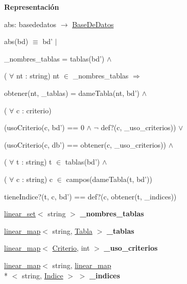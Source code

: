 \begin{Indent}{\bf Representación}
{abs\-: basededatos $\to$ \hyperlink{classBaseDeDatos}{Base\-De\-Datos}\par
abs(bd) $\equiv$ bd' $|$
\begin{DoxyItemize}
\item \-\_\-nombres\-\_\-tablas = tablas(bd') $\land$
\item ( $\forall$ nt \-: string) nt $\in$ \-\_\-nombres\-\_\-tablas $\Rightarrow$
\begin{DoxyItemize}
\item obtener(nt, \-\_\-tablas) = dame\-Tabla(nt, bd') $\land$
\end{DoxyItemize}
\item ( $\forall$ c \-: criterio)
\begin{DoxyItemize}
\item (uso\-Criterio(c, bd') == 0 $\land$ $\lnot$ def?(c, \-\_\-uso\-\_\-criterios)) $\lor$
\item (uso\-Criterio(c, db') == obtener(c, \-\_\-uso\-\_\-criterios)) $\land$
\end{DoxyItemize}
\item ( $\forall$ t \-: string) t $\in$ tablas(bd') $\land$
\item ( $\forall$ c \-: string) c $\in$ campos(dame\-Tabla(t, bd'))
\begin{DoxyItemize}
\item tiene\-Indice?(t, c, bd') == def?(c, obtener(t, \-\_\-indices)) 
\end{DoxyItemize}
\end{DoxyItemize}}\begin{DoxyCompactItemize}
\item 
\hypertarget{classBaseDeDatos_ae93f3d0a8d138e5742c52b9f2294d2bd}{\hyperlink{classlinear__set}{linear\-\_\-set}$<$ string $>$ {\bfseries \-\_\-nombres\-\_\-tablas}}\label{classBaseDeDatos_ae93f3d0a8d138e5742c52b9f2294d2bd}

\item 
\hypertarget{classBaseDeDatos_abc71fb94bf17d92df678705224cfd9b0}{\hyperlink{classlinear__map}{linear\-\_\-map}$<$ string, \hyperlink{classTabla}{Tabla} $>$ {\bfseries \-\_\-tablas}}\label{classBaseDeDatos_abc71fb94bf17d92df678705224cfd9b0}

\item 
\hypertarget{classBaseDeDatos_acc03ee648f19ad950d399861cc263a30}{\hyperlink{classlinear__map}{linear\-\_\-map}$<$ \hyperlink{classBaseDeDatos_a6742a222e87623bc92a810a693fb337b}{Criterio}, int $>$ {\bfseries \-\_\-uso\-\_\-criterios}}\label{classBaseDeDatos_acc03ee648f19ad950d399861cc263a30}

\item 
\hypertarget{classBaseDeDatos_adb2234a6b0c8cb3b0b503f3e48cc3cc5}{\hyperlink{classlinear__map}{linear\-\_\-map}$<$ string, \hyperlink{classlinear__map}{linear\-\_\-map}\\*
$<$ string, \hyperlink{classBaseDeDatos_a1e94d358c9ef6e71f9d6bfb662e553cb}{Indice} $>$ $>$ {\bfseries \-\_\-indices}}\label{classBaseDeDatos_adb2234a6b0c8cb3b0b503f3e48cc3cc5}

\end{DoxyCompactItemize}
\end{Indent}


